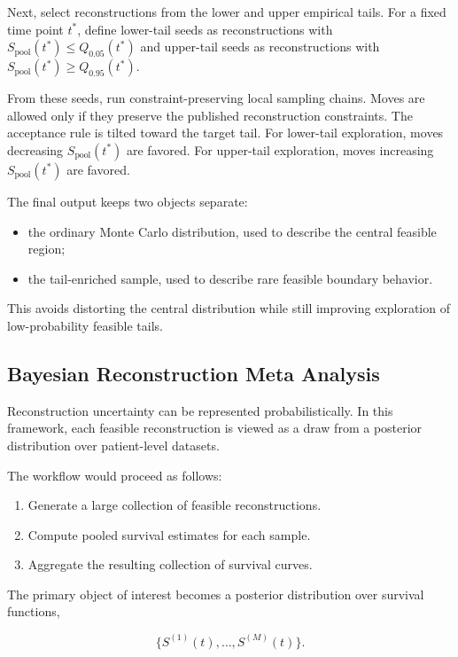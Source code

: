 \documentclass[11pt]{article}
\begin{document}
Next, select reconstructions from the lower and upper empirical tails. For a fixed time point \(t^\ast\), define lower-tail seeds as reconstructions with \(S_{\text{pool}}(t^\ast)\le Q_{0.05}(t^\ast)\) and upper-tail seeds as reconstructions with \(S_{\text{pool}}(t^\ast)\ge Q_{0.95}(t^\ast)\).

From these seeds, run constraint-preserving local sampling chains. Moves are allowed only if they preserve the published reconstruction constraints. The acceptance rule is tilted toward the target tail. For lower-tail exploration, moves decreasing \(S_{\text{pool}}(t^\ast)\) are favored. For upper-tail exploration, moves increasing \(S_{\text{pool}}(t^\ast)\) are favored.

The final output keeps two objects separate:

\begin{itemize}
\item the ordinary Monte Carlo distribution, used to describe the central feasible region;
\item the tail-enriched sample, used to describe rare feasible boundary behavior.
\end{itemize}

This avoids distorting the central distribution while still improving exploration of low-probability feasible tails.

\subsection{Bayesian Reconstruction Meta Analysis}

Reconstruction uncertainty can be represented probabilistically. In this framework, each feasible reconstruction is viewed as a draw from a posterior distribution over patient-level datasets.

The workflow would proceed as follows:

\begin{enumerate}
\item Generate a large collection of feasible reconstructions.
\item Compute pooled survival estimates for each sample.
\item Aggregate the resulting collection of survival curves.
\end{enumerate}

The primary object of interest becomes a posterior distribution over survival functions,

\[
\{S^{(1)}(t), \ldots, S^{(M)}(t)\}.
\]
\end{document}
